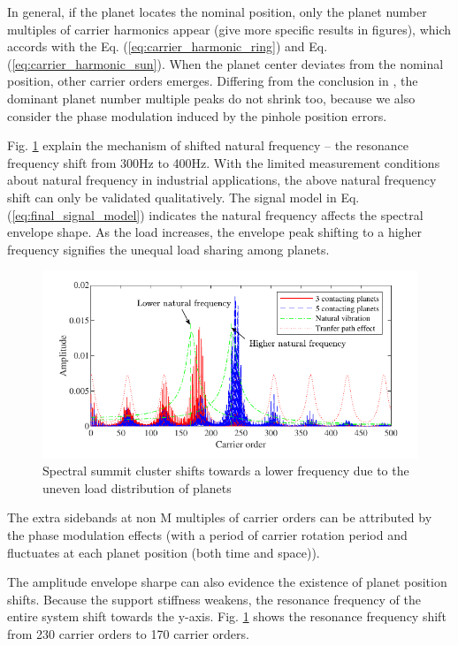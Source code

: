 \documentclass[a4paper,fleqn]{cas-sc}%
\begin{document}
\par In general, if the planet locates the nominal position, only the planet number multiples of carrier harmonics appear (give more specific results in figures), which accords with the Eq. (\ref{eq:carrier_harmonic_ring}) and Eq. (\ref{eq:carrier_harmonic_sun}). When the planet center deviates from the nominal position, other carrier orders emerges. Differing from the conclusion in \cite{Mark2009}, the dominant planet number multiple peaks do not shrink too, because we also consider the phase modulation induced by the pinhole position errors. 
\par Fig. \ref{fig:Shifted_natural_frequency} explain the mechanism of shifted natural frequency -- the resonance frequency shift from 300Hz to 400Hz. With the limited measurement conditions about natural frequency in industrial applications, the above natural frequency shift can only be validated qualitatively. The signal model in Eq. (\ref{eq:final_signal_model}) indicates the natural frequency affects the spectral envelope shape. As the load increases, the envelope peak shifting to a higher frequency signifies the unequal load sharing among planets. 

\begin{figure}[pos=htbp]
    \centering
    \includegraphics[scale=1]{Shifted_natural_frequency}
    \caption{Spectral summit cluster shifts towards a lower frequency due to the uneven load distribution of planets}\label{fig:Shifted_natural_frequency}
\end{figure}
\par The extra sidebands at non M multiples of carrier orders can be attributed by the phase modulation effects (with a period of carrier rotation period and fluctuates at each planet position (both time and space)).
\par The amplitude envelope sharpe can also evidence the existence of planet position shifts. Because the support stiffness weakens, the resonance frequency of the entire system shift towards the y-axis. Fig. \ref{fig:Shifted_natural_frequency} shows the resonance frequency shift from 230 carrier orders to 170 carrier orders.
\end{document}
